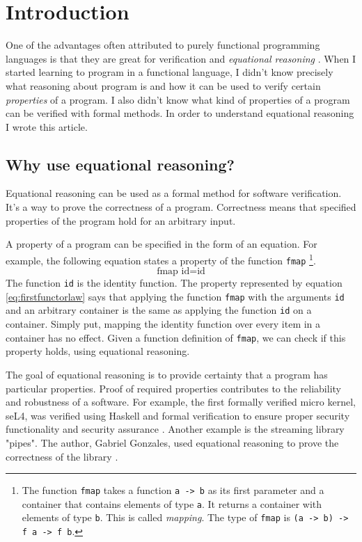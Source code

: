 \section{Introduction}
\label{sec:This}

One of the advantages often attributed to purely functional programming languages is that they are great for \gls{verification} and \emph{equational reasoning} \cite{Wadler87}.
When I started learning to program in a functional language, I didn't know precisely what reasoning about program is and how it can be used to verify certain \emph{properties} of a program. I also didn't know what kind of properties of a program can be verified with formal methods. In order to understand equational reasoning I wrote this article.

\subsection{Why use equational reasoning?}

Equational reasoning can be used as a formal method for software verification. It's a way to prove the correctness of a program. Correctness means that specified properties of the program hold for an arbitrary input. 

A property of a program can be specified in the form of an equation. For example, the following equation states a property of the function \verb|fmap|  \footnote{The function \verb|fmap| takes a function \verb|a -> b| as its first parameter and a container that contains elements of type \verb|a|. It returns a container with elements of type \verb|b|. This is called \emph{mapping}. The type of \verb|fmap| is \verb|(a -> b) -> f a -> f b|.}.
\begin{equation}
  \label{eq:firstfunctorlaw}
\text{fmap } \text{id}  =  \text{id}  
\end{equation}
 The function \verb|id| is the identity function. The property represented by equation \ref{eq:firstfunctorlaw} says that applying the function \verb|fmap| with the arguments \verb|id| and an arbitrary container is the same as applying the function \verb|id| on a container. Simply put, mapping the identity function over every item in a container has no effect. Given a function definition of \verb|fmap|, we can check if this property holds, using equational reasoning.

The goal of equational reasoning is to provide certainty that a program has particular properties. Proof of required properties contributes to the reliability and robustness of a software. 
For example, the first formally verified micro kernel, seL4, was verified using Haskell and formal verification to ensure proper security functionality and security assurance \cite{Klein09}.
Another example is the streaming library "pipes". The author, Gabriel Gonzales, used equational reasoning to prove the correctness of the library \cite{gonzales13}.

